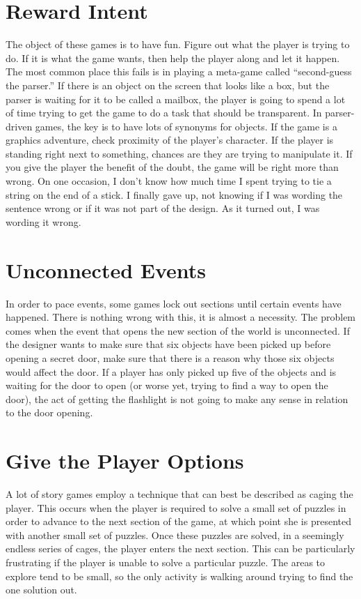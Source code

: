 \documentclass[12pt,letterpaper]{article}
\begin{document}
\section*{Reward Intent} The object of these games is to have fun. Figure out
what the player is trying to do. If it is what the game wants, then help the
player along and let it happen. The most common place this fails is in playing
a meta-game called ``second-guess the parser.'' If there is an object on the
screen that looks like a box, but the parser is waiting for it to be called a
mailbox, the player is going to spend a lot of time trying to get the game to
do a task that should be transparent. In parser-driven games, the key is to
have lots of synonyms for objects. If the game is a graphics adventure, check
proximity of the player's character. If the player is standing right next to
something, chances are they are trying to manipulate it. If you give the player
the benefit of the doubt, the game will be right more than wrong. On one
occasion, I don't know how much time I spent trying to tie a string on the end
of a stick. I finally gave up, not knowing if I was wording the sentence wrong
or if it was not part of the design. As it turned out, I was wording it wrong.

\section*{Unconnected Events} In order to pace events, some games lock out
sections until certain events have happened. There is nothing wrong with this,
it is almost a necessity. The problem comes when the event that opens the new
section of the world is unconnected. If the designer wants to make sure that
six objects have been picked up before opening a secret door, make sure that
there is a reason why those six objects would affect the door. If a player has
only picked up five of the objects and is waiting for the door to open (or
worse yet, trying to find a way to open the door), the act of getting the
flashlight is not going to make any sense in relation to the door opening.

\section*{Give the Player Options} A lot of story games employ a technique that
can best be described as caging the player. This occurs when the player is
required to solve a small set of puzzles in order to advance to the next
section of the game, at which point she is presented with another small set of
puzzles. Once these puzzles are solved, in a seemingly endless series of cages,
the player enters the next section. This can be particularly frustrating if the
player is unable to solve a particular puzzle. The areas to explore tend to be
small, so the only activity is walking around trying to find the one solution
out.
\end{document}
